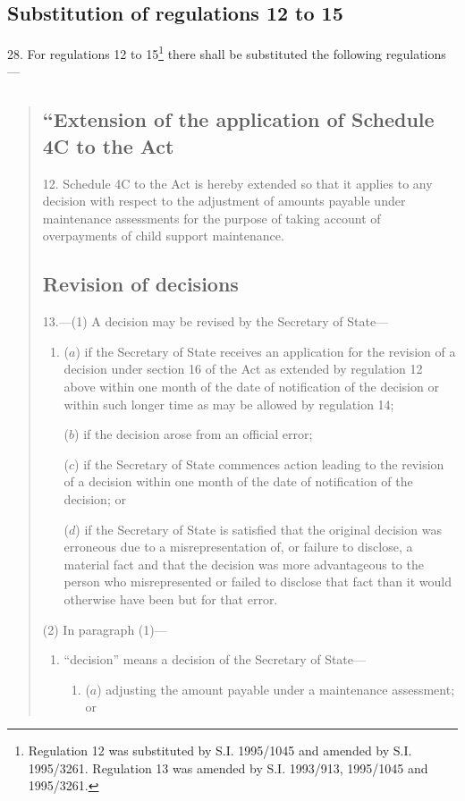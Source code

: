 \documentclass[12pt,a4paper]{article}
\begin{document}
\subsection[28. Substitution of regulations 12 to 15]{Substitution of regulations 12 to 15}

28.  For regulations 12 to 15\footnote{\frenchspacing Regulation 12 was substituted by S.I. 1995/1045 and amended by S.I. 1995/3261. Regulation 13 was amended by S.I. 1993/913, 1995/1045 and 1995/3261.} there shall be substituted the following regulations—
\begin{quotation}
\subsection*{“Extension of the application of Schedule 4C to the Act}

12.  Schedule 4C to the Act is hereby extended so that it applies to any decision with respect to the adjustment of amounts payable under maintenance assessments for the purpose of taking account of overpayments of child support maintenance.

\subsection*{Revision of decisions}

13.—(1) A decision may be revised by the Secretary of State—
\begin{enumerate}\item[]
($a$) if the Secretary of State receives an application for the revision of a decision under section 16 of the Act as extended by regulation 12 above within one month of the date of notification of the decision or within such longer time as may be allowed by regulation 14;

($b$) if the decision arose from an official error;

($c$) if the Secretary of State commences action leading to the revision of a decision within one month of the date of notification of the decision; or

($d$) if the Secretary of State is satisfied that the original decision was erroneous due to a misrepresentation of, or failure to disclose, a material fact and that the decision was more advantageous to the person who misrepresented or failed to disclose that fact than it would otherwise have been but for that error.
\end{enumerate}

(2) In paragraph (1)—
\begin{enumerate}\item[]
    “decision” means a decision of the Secretary of State—
\begin{enumerate}\item[]
    ($a$)
    adjusting the amount payable under a maintenance assessment; or


\end{enumerate}
\end{enumerate}
\end{quotation}
\end{document}
